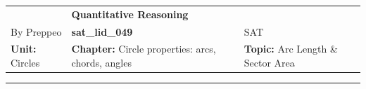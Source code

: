 \documentclass[11pt,paper=a4,answers]{exam}
\begin{document}
\begin{center}
    \centering
    \renewcommand{\arraystretch}{1.5}
    \begin{tabularx}{\textwidth}{YYY}
    & \normalsize\bf{{\Large{{Quantitative Reasoning}}}} & \\
    By Preppeo & \normalsize\bf{{sat\_lid\_049}} & SAT\\
    \normalsize{{\textbf{{Unit:}} Circles}} & \normalsize{{\textbf{{Chapter:}} Circle properties: arcs, chords, angles}} & \normalsize{{\textbf{{Topic:}} Arc Length \& Sector Area}} \\
    \end{tabularx}
\end{center}
\par\noindent\rule{\textwidth}{1pt}
\end{document}
